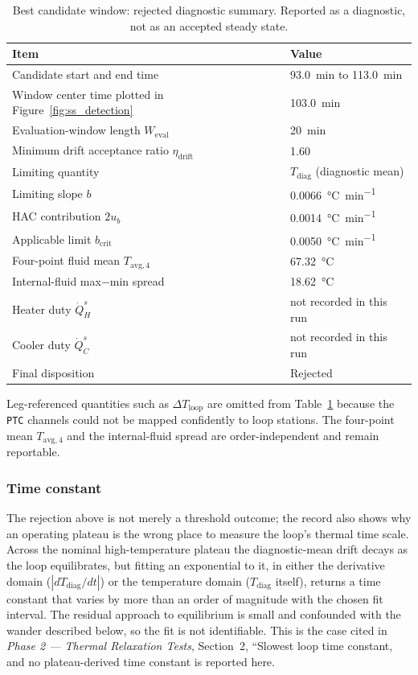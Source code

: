\documentclass[11pt]{article}
\renewcommand{\arraystretch}{1.18}
\newcommand{\Tavg}{T_{\mathrm{avg},4}}
\newcommand{\Tdiag}{T_{\mathrm{diag}}}
\newcommand{\QHs}{\dot Q_{H}^{s}}
\newcommand{\QCs}{\dot Q_{C}^{s}}
\newcommand{\PhaseTwoDoc}{\textit{Phase 2 --- Thermal Relaxation Tests}}
\begin{document}
\begin{table}[H]
\centering
\caption{Best candidate window: rejected diagnostic summary. Reported as a
diagnostic, not as an accepted steady state.}
\label{tab:candidate}
{\small
\renewcommand{\arraystretch}{1.18}
\begin{tabularx}{0.86\textwidth}{@{}>{\raggedright\arraybackslash}X>{\raggedleft\arraybackslash}p{2.5in}@{}}
\toprule
\textbf{Item} & \textbf{Value} \\
\midrule
Candidate start and end time & \SI{93.0}{min} to \SI{113.0}{min} \\
Window center time plotted in Figure~\ref{fig:ss_detection} & \SI{103.0}{min} \\
Evaluation-window length $W_{\mathrm{eval}}$ & \SI{20}{min} \\
Minimum drift acceptance ratio $\eta_{\mathrm{drift}}$ & \num{1.60} \\
Limiting quantity & $\Tdiag$ (diagnostic mean) \\
Limiting slope $b$ & \SI{+0.0066}{\degreeCelsius\per min} \\
HAC contribution $2u_b$ & \SI{0.0014}{\degreeCelsius\per min} \\
Applicable limit $b_{\mathrm{crit}}$ & \SI{0.0050}{\degreeCelsius\per min} \\
Four-point fluid mean $\Tavg$ & \SI{67.32}{\degreeCelsius} \\
Internal-fluid max$-$min spread & \SI{18.62}{\degreeCelsius} \\
Heater duty $\QHs$ & not recorded in this run \\
Cooler duty $\QCs$ & not recorded in this run \\
Final disposition & Rejected \\
\bottomrule
\end{tabularx}}
\end{table}

Leg-referenced quantities such as $\Delta T_{\mathrm{loop}}$ are omitted from
Table~\ref{tab:candidate} because the \texttt{PTC} channels could not be mapped
confidently to loop stations. The four-point mean $\Tavg$ and the internal-fluid
spread are order-independent and remain reportable.

\subsubsection{Time constant}

The rejection above is not merely a threshold outcome; the record also shows
why an operating plateau is the wrong place to measure the loop's thermal time
scale. Across the nominal high-temperature plateau the diagnostic-mean drift
decays as the loop equilibrates, but fitting an exponential to it, in either
the derivative domain ($|d\Tdiag/dt|$) or the temperature domain ($\Tdiag$
itself), returns a time constant that varies by more than an order of magnitude
with the chosen fit interval. The residual approach to equilibrium is small and
confounded with the wander described below, so the fit is not identifiable.
This is the case cited in \PhaseTwoDoc, Section~2, ``Slowest loop time constant, and no plateau-derived
time constant is reported here.
\end{document}
